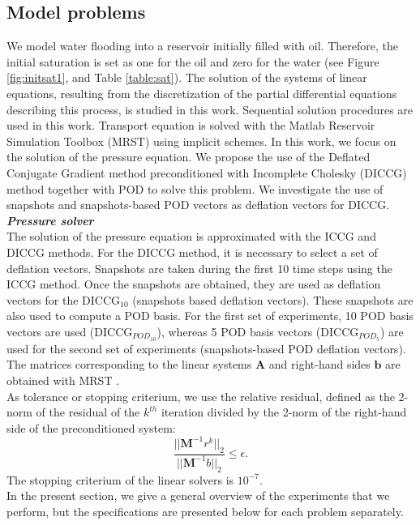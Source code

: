 \documentclass[12pt]{article}
\begin{document}
\subsection{Model problems}\label{modpro}
\hspace{0.5cm} We model water flooding into a reservoir initially filled with oil. Therefore, the initial saturation is set as one for the oil and zero for the water (see Figure \ref{fig:initsat1}, and Table \ref{table:sat}). 
The solution of the systems of linear equations, resulting from the discretization of the partial differential equations describing this process, is studied in this work. Sequential solution procedures are used in this work. Transport equation is solved with the Matlab Reservoir Simulation Toolbox (MRST) \cite{Lie13} using implicit schemes.
In this work, we focus on the solution of the pressure equation. We propose the use of the Deflated Conjugate Gradient method preconditioned with Incomplete Cholesky (DICCG) method together with POD to solve this problem. We investigate the use of snapshots and snapshots-based POD vectors as deflation vectors for DICCG.\\
\emph{\textbf{Pressure solver}}\\
The solution of the pressure equation is approximated with the ICCG and DICCG methods. 
For the DICCG method, it is necessary to select a set of deflation vectors. Snapshots are taken during the first 10 time steps using the ICCG method. Once the snapshots are obtained, they are used as deflation vectors for the DICCG$_{10}$ (snapshots based deflation vectors). These snapshots are also used to compute a POD basis. For the first set of experiments, 10 POD basis vectors are used (DICCG$_{POD_{10}}$), whereas 5 POD basis vectors (DICCG$_{POD_{5}}$) are used for the second set of experiments (snapshots-based POD deflation vectors). The matrices corresponding to the linear systems $\mathbf{A}$ and right-hand sides $\mathbf{b}$ are obtained with MRST \cite{Lie13}. \\
As tolerance or stopping criterium, we use the relative residual, defined as the 2-norm of the residual of the $k^{th}$ iteration divided by 
the 2-norm of the right-hand side of the preconditioned system: 
$$\frac{||\mathbf{M}^{-1}r^k||_2}{||\mathbf{M}^{-1}b||_2}\leq \epsilon.$$
The stopping criterium of the linear solvers is $10^{-7}$. \\
In the present section, we give a general overview of the experiments that we perform, but the specifications are presented below for each problem separately. 
\end{document}
